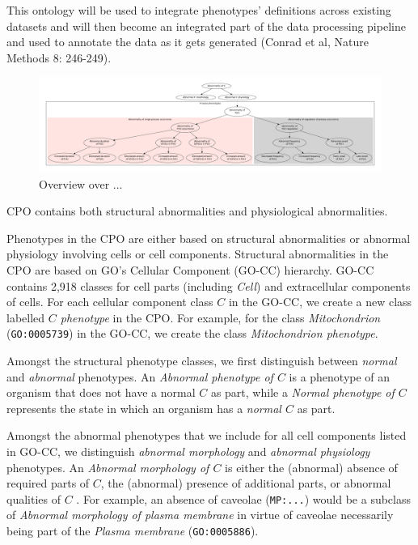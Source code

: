 \documentclass{bioinfo}
\renewcommand{\cite}{\citep}
\begin{document}
This ontology will be used to integrate phenotypes' definitions across
existing datasets and will then become an integrated part of the data
processing pipeline and used to annotate the data as it gets generated
(Conrad et al, Nature Methods 8: 246-249).

\begin{figure}[h]
  \centering
  \includegraphics[width=\textwidth,
  height=.33\textheight]{overview.pdf}
  \caption{Overview over ...\label{fig:overview}}
\end{figure}

CPO contains both structural abnormalities and physiological
abnormalities.

Phenotypes in the CPO are either based on structural abnormalities or
abnormal physiology involving cells or cell components. Structural
abnormalities in the CPO are based on GO's Cellular Component (GO-CC)
hierarchy. GO-CC contains 2,918 classes for cell parts (including {\em
  Cell}) and extracellular components of cells. For each cellular
component class $C$ in the GO-CC, we create a new class labelled {\em
  $C$ phenotype} in the CPO. For example, for the class {\em
  Mitochondrion} ({\tt GO:0005739}) in the GO-CC, we create the class
{\em Mitochondrion phenotype}.

Amongst the structural phenotype classes, we first distinguish between
{\em normal} and {\em abnormal} phenotypes. An {\em Abnormal phenotype
  of $C$} is a phenotype of an organism that does not have a normal
$C$ as part, while a {\em Normal phenotype of $C$} represents the
state in which an organism has a {\em normal $C$} as part.

Amongst the abnormal phenotypes that we include for all cell
components listed in GO-CC, we distinguish {\em abnormal morphology}
and {\em abnormal physiology} phenotypes. An {\em Abnormal morphology
  of $C$} is either the (abnormal) absence of required parts of $C$,
the (abnormal) presence of additional parts, or abnormal qualities of
$C$ \cite{Hoehndorf2010phene}. For example, an absence of caveolae
({\tt MP:...}) would be a subclass of {\em Abnormal morphology of
  plasma membrane} in virtue of caveolae necessarily being part of the
{\em Plasma membrane} ({\tt GO:0005886}).
\end{document}
